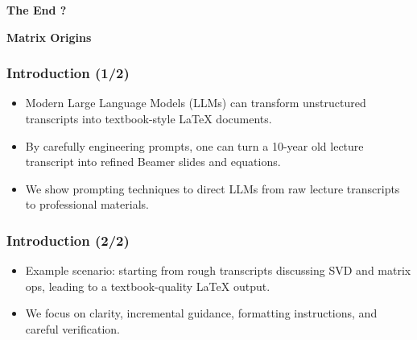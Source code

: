 \documentclass[aspectratio=169]{beamer}
\begin{document}
\begin{frame}
    \centering
    \vfill
    {\Huge \textbf{The End \pause ?}}
    \vfill
\end{frame}

\begin{frame}
    \centering
    \vfill
    {\Huge \textbf{Matrix Origins}}
    \vfill
\end{frame}



\begin{frame}
\frametitle{Introduction (1/2)}
\begin{itemize}[<+->]
\item Modern Large Language Models (LLMs) can transform unstructured transcripts into textbook-style LaTeX documents.
\item By carefully engineering prompts, one can turn a 10-year old lecture transcript into refined Beamer slides and equations.
\item We show prompting techniques to direct LLMs from raw lecture transcripts to professional materials.
\end{itemize}
\end{frame}

\begin{frame}
\frametitle{Introduction (2/2)}
\begin{itemize}[<+->]
\item Example scenario: starting from rough transcripts discussing SVD and matrix ops, leading to a textbook-quality LaTeX output.
\item We focus on clarity, incremental guidance, formatting instructions, and careful verification.
\end{itemize}
\end{frame}
\end{document}

